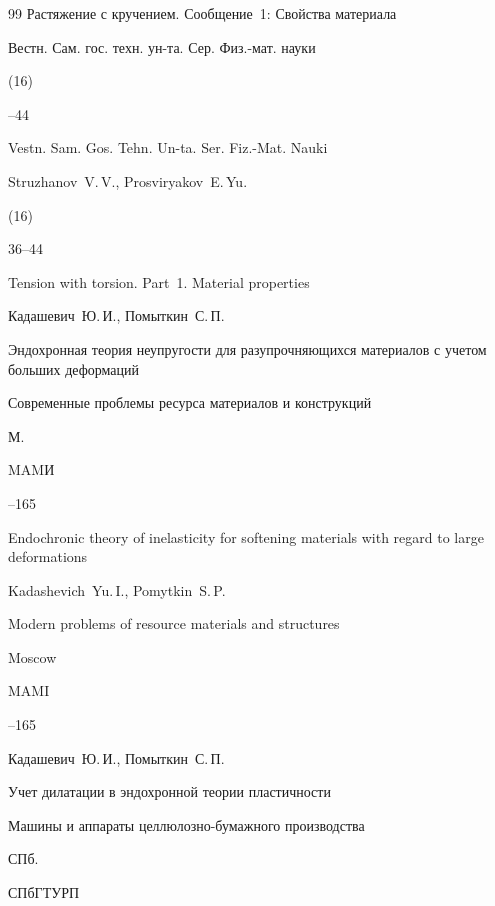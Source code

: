 \begin{thebibliography}{99}
\paper Растяжение с кручением. Сообщение~1: Свойства материала

\jour  Вестн. Сам. гос. техн. ун-та. Сер. Физ.-мат. науки


(16)

--44

\misctransl

\jour  Vestn. Sam. Gos. Tehn. Un-ta. Ser. Fiz.-Mat. Nauki

\by Struzhanov~V.\,V., Prosviryakov~E.\,Yu.


(16)

\pages \mbox{36--44}

\paper Tension with torsion. Part~1. Material properties




\by Кадашевич~Ю.\,И., Помыткин~С.\,П.

\paper Эндохронная теория неупругости для разупрочняющихся материалов с учетом больших деформаций

\inbook Современные проблемы ресурса материалов и конструкций

\publaddr М.

\publ MAMИ


--165

\misctransl

\paper Endochronic theory of inelasticity for softening materials with regard to large deformations

\by Kadashevich~Yu.\,I., Pomytkin~S.\,P.

\inbook Modern problems of resource materials and structures

\publaddr Moscow

\publ MAMI


--165






\by Кадашевич~Ю.\,И., Помыткин~С.\,П.

\paper Учет дилатации в эндохронной теории пластичности 

\inbook Машины и аппараты целлюлозно-бумажного производства

\publaddr СПб.

\publ СПбГТУРП


\end{thebibliography}
